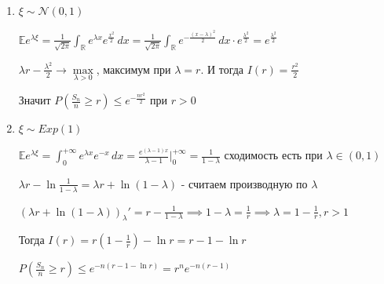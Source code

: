  \begin{example}
    \begin{enumerate}
        \item {
            $\xi \sim \mathcal{N} (0, 1)$

            $\mathbb{E} e^{\lambda \xi} = \frac{1}{\sqrt{2\pi}} \int_{\mathbb{R}} e^{\lambda x} e^{\frac{x^2}{2}} \, dx =
            \frac{1}{\sqrt{2\pi}} \int_{\mathbb{R}} e^{-\frac{(x - \lambda)^2}{2}} \, dx \cdot e^{\frac{\lambda^2}{2}} = e^{\frac{\lambda^2}{2}}$

            $\lambda r - \frac{\lambda^2}{2} \rightarrow \max\limits_{\lambda > 0}$, максимум при $\lambda = r$. И тогда $I(r) = \frac{r^2}{2}$

            Значит $P \left( \frac{S_n}{n} \geqslant r \right) \leqslant e^{-\frac{nr^2}{2}}$ при $r > 0$
        }
        \item {
            $\xi \sim Exp(1)$

            $\mathbb{E} e^{\lambda \xi} = \int_0^{+\infty} e^{\lambda x} e^{-x} \, dx = \frac{e^{(\lambda - 1)x}}{\lambda - 1} \bigg |_0^{+\infty} = \frac{1}{1 - \lambda}$ сходимость есть при $\lambda \in (0, 1)$

            $\lambda r - \ln \frac{1}{1 - \lambda} = \lambda r + \ln (1 - \lambda)$ - считаем производную по $\lambda$

            $(\lambda r + \ln (1 - \lambda))_\lambda' = r - \frac{1}{1 - \lambda} \implies 1 - \lambda = \frac{1}{r} \implies \lambda = 1 - \frac{1}{r}, r > 1$

            Тогда $I(r) = r (1 - \frac{1}{r}) - \ln r = r - 1 - \ln r$

            $P \left( \frac{S_n}{n} \geqslant r \right) \leqslant e^{-n (r -1 - \ln r)} = r^n e^{-n (r - 1)}$
        }
    \end{enumerate}
 \end{example}
